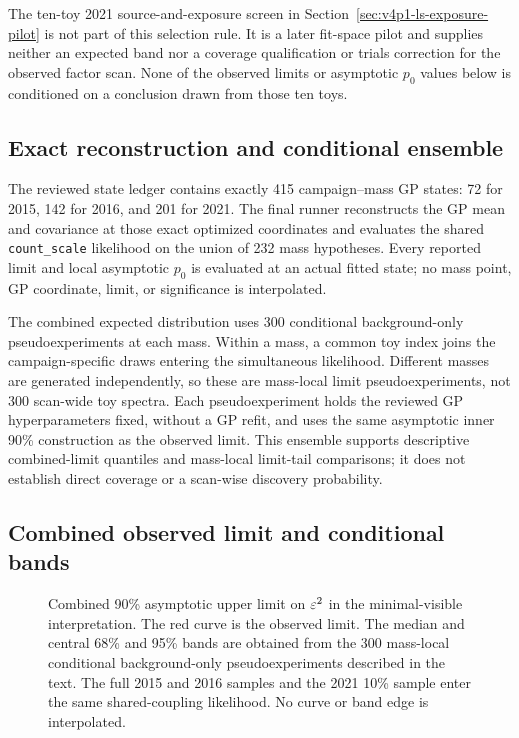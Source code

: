 The ten-toy 2021 source-and-exposure screen in
Section~\ref{sec:v4p1-ls-exposure-pilot} is not part of this selection rule. It is
a later fit-space pilot and supplies neither an expected band nor a coverage
qualification or trials correction for the observed factor scan. None of the
observed limits or asymptotic $p_0$ values below is conditioned on a conclusion
drawn from those ten toys.

\subsection{Exact reconstruction and conditional ensemble}
\label{sec:results-v4p2-reconstruction}

The reviewed state ledger contains exactly 415 campaign--mass GP states: 72 for
2015, 142 for 2016, and 201 for 2021. The final runner reconstructs the GP mean
and covariance at those exact optimized coordinates and evaluates the shared
\texttt{count\_scale} likelihood on the union of 232 mass hypotheses. Every
reported limit and local asymptotic $p_0$ is evaluated at an actual fitted state;
no mass point, GP coordinate, limit, or significance is interpolated.

The combined expected distribution uses 300 conditional background-only
pseudoexperiments at each mass. Within a mass, a common toy index joins the
campaign-specific draws entering the simultaneous likelihood. Different masses
are generated independently, so these are mass-local limit pseudoexperiments,
not 300 scan-wide toy spectra. Each pseudoexperiment holds the reviewed GP
hyperparameters fixed, without a GP refit, and uses the same asymptotic inner
90\% \CLs{} construction as the observed limit. This ensemble supports
descriptive combined-limit quantiles and mass-local limit-tail comparisons; it
does not establish direct \CLs{} coverage or a scan-wise discovery probability.

\subsection{Combined observed limit and conditional bands}
\label{sec:results-v4p2-combined-limit}
\label{sec:results-v4-combined-limit}

\begin{figure}[H]
\centering
{}
\caption{Combined 90\% asymptotic \CLs{} upper limit on $\varepsilon^2$ in the
minimal-visible interpretation. The red curve is the observed limit. The median
and central 68\% and 95\% bands are obtained from the 300 mass-local
conditional background-only pseudoexperiments described in the text. The full
2015 and 2016
samples and the 2021 10\% sample enter the same shared-coupling likelihood. No
curve or band edge is interpolated.}
\label{fig:results-v4p2-combined-band}
\end{figure}

